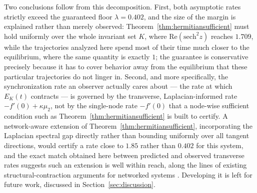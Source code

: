 \documentclass[preprint,12pt,authoryear]{elsarticle}
\begin{document}
Two conclusions follow from this decomposition. First, both asymptotic rates strictly exceed the guaranteed floor $\lambda=0.402$, and the size of the margin is explained rather than merely observed: Theorem~\ref{thm:hermitiansufficient} must hold uniformly over the whole invariant set $K$, where $\mathrm{Re}(\mathrm{sech}^2 z)$ reaches $1.709$, while the trajectories analyzed here spend most of their time much closer to the equilibrium, where the same quantity is exactly $1$; the guarantee is conservative precisely because it has to cover behavior away from the equilibrium that these particular trajectories do not linger in. Second, and more specifically, the synchronization rate an observer actually cares about — the rate at which $E_K(t)$ contracts — is governed by the transverse, Laplacian-informed rate $-f'(0)+\kappa\mu_2$, not by the single-node rate $-f'(0)$ that a node-wise sufficient condition such as Theorem~\ref{thm:hermitiansufficient} is built to certify. A network-aware extension of Theorem~\ref{thm:hermitiansufficient}, incorporating the Laplacian spectral gap directly rather than bounding uniformly over all tangent directions, would certify a rate close to $1.85$ rather than $0.402$ for this system, and the exact match obtained here between predicted and observed transverse rates suggests such an extension is well within reach, along the lines of existing structural-contraction arguments for networked systems \cite{alradhawi2023structural}. Developing it is left for future work, discussed in Section~\ref{sec:discussion}.
\end{document}
